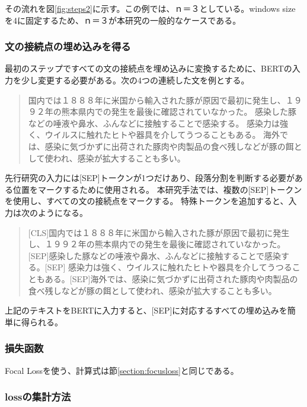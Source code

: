 \documentclass[
  platex, dvipdfmx,  %
]{nlp2021}
\begin{document}
その流れを図\ref{fig:steps2}に示す。この例では、ｎ＝３としている。windows sizeを4に固定するため、ｎ＝３が本研究の一般的なケースである。

\subsubsection{文の接続点の埋め込みを得る}

最初のステップですべての文の接続点を埋め込みに変換するために、BERTの入力を少し変更する必要がある。次の4つの連続した文を例とする。

\begin{quote}
  \small{国内では１８８８年に米国から輸入された豚が原因で最初に発生し、１９９２年の熊本県内での発生を最後に確認されていなかった。
  感染した豚などの唾液や鼻水、ふんなどに接触することで感染する。 
  感染力は強く、ウイルスに触れたヒトや器具を介してうつることもある。
  海外では、感染に気づかずに出荷された豚肉や肉製品の食べ残しなどが豚の餌として使われ、感染が拡大することも多い。}
\end{quote}

先行研究の入力には[SEP]トークンが1つだけあり、段落分割を判断する必要がある位置をマークするために使用される。 本研究手法では、複数の[SEP]トークンを使用し、すべての文の接続点をマークする。 特殊トークンを追加すると、入力は次のようになる。

\begin{quote}
  \small{[CLS]国内では１８８８年に米国から輸入された豚が原因で最初に発生し、１９９２年の熊本県内での発生を最後に確認されていなかった。[SEP]感染した豚などの唾液や鼻水、ふんなどに接触することで感染する。[SEP] 感染力は強く、ウイルスに触れたヒトや器具を介してうつることもある。[SEP]海外では、感染に気づかずに出荷された豚肉や肉製品の食べ残しなどが豚の餌として使われ、感染が拡大することも多い。}
\end{quote}

上記のテキストをBERTに入力すると、[SEP]に対応するすべての埋め込みを簡単に得られる。

\subsubsection{損失函数}

Focal Lossを使う、計算式は節\ref{section:focusloss}と同じである。

\subsubsection{lossの集計方法}
\end{document}
